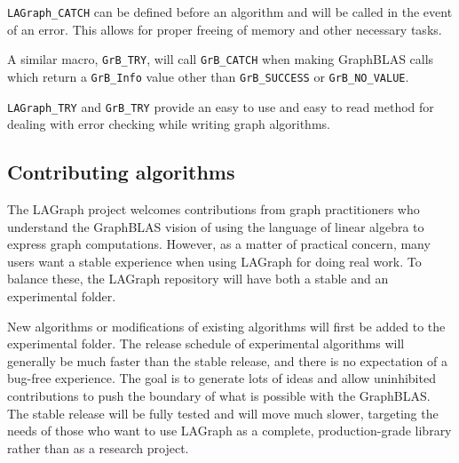 \verb'LAGraph_CATCH' can be defined before an algorithm and will be called in the event of an error.
This allows for proper freeing of memory and other necessary tasks.

A similar macro, \verb'GrB_TRY', will call \verb'GrB_CATCH' when making GraphBLAS calls which return
a \verb'GrB_Info' value other than \verb'GrB_SUCCESS' or \verb'GrB_NO_VALUE'.

\verb'LAGraph_TRY' and \verb'GrB_TRY' provide an easy to use and easy to read method for dealing with
error checking while writing graph algorithms.


\subsection{Contributing algorithms}

The LAGraph project welcomes contributions from graph practitioners who understand the GraphBLAS vision
of using the language of linear algebra to express graph computations. However, as a matter of
practical concern, many users want a stable experience when using LAGraph for doing real work. To balance
these, the LAGraph repository will have both a stable and an experimental folder.

New algorithms or modifications of existing algorithms will first be added to the experimental folder.
The release schedule of experimental algorithms will generally be much faster than the stable release,
and there is no expectation of a bug-free experience.
The goal is to generate lots of ideas and allow uninhibited contributions to
push the boundary of what is possible with the GraphBLAS. The stable release will be fully tested and
will move much slower, targeting the needs of those who want to use LAGraph as a complete, production-grade
library rather than as a research project.
